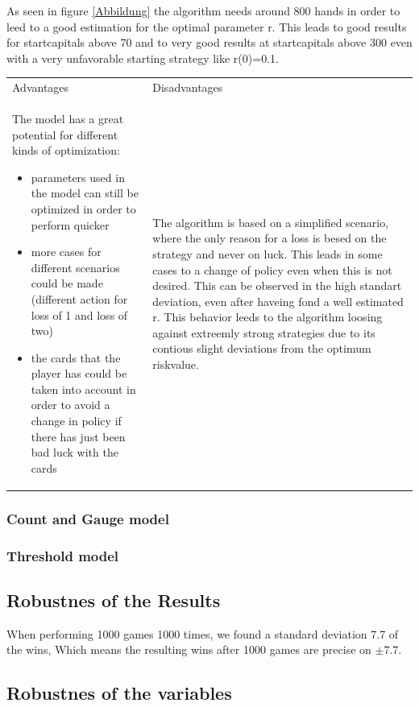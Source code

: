 \documentclass[11pt]{article}
\begin{document}
As seen in figure \ref{Abbildung} the algorithm needs around 800 hands in order to leed to a good estimation for the optimal parameter r. This leads to good results for startcapitals above 70 and to very good results at startcapitals above 300 even with a very unfavorable starting strategy like r(0)=0.1.
\\
\begin{tabular}{ p{7.2cm}  p{7.2cm}}
Advantages & Disadvantages\\
The model has a great potential for different kinds of optimization:
\begin{itemize}
\item parameters used in the model can still be optimized in order to perform quicker
\item more cases for different scenarios could be made (different action for loss of 1 and loss of two)
\item the cards that the player has could be taken into account in order to avoid a change in policy if there has just been bad luck with the cards 
\end{itemize}
 & The algorithm is based on a simplified scenario, where the only reason for a loss is besed on the strategy and never on luck. This leads in some cases to a change of policy even when this is not desired. This can be observed in the high standart deviation, even after haveing fond a well estimated r. This behavior leeds to the algorithm loosing against extreemly strong strategies due to its contious slight deviations from the optimum  riskvalue.\\ 
\end{tabular}

\subsubsection{Count and Gauge model}

\subsubsection{Threshold model}



\subsection{Robustnes of the Results}
When performing 1000 games 1000 times, we found a standard deviation 7.7 of the wins, Which means the resulting wins after 1000 games are precise on $\pm 7.7$.
\subsection{Robustnes of the variables}
\end{document}
